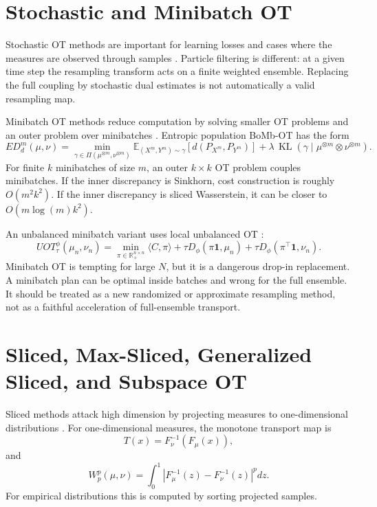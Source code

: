 \documentclass[11pt]{article}
\newcommand{\R}{\mathbb{R}}
\newcommand{\ones}{\mathbf{1}}
\newcommand{\KL}{\operatorname{KL}}
\begin{document}
\section{Stochastic and Minibatch OT}

Stochastic OT methods are important for learning losses and cases where the
measures are observed through samples
\citep{genevay2016stochastic,genevay2018samplecomplexity}.  Particle filtering
is different: at a given time step the resampling transform acts on a finite
weighted ensemble.
Replacing the full coupling by stochastic dual estimates is not automatically
a valid resampling map.

Minibatch OT methods reduce computation by solving smaller OT problems and an
outer problem over minibatches \citep{nguyen2022bomb}.  Entropic population
BoMb-OT has the form
\begin{equation}
ED^m_d(\mu,\nu)
=
\min_{\gamma\in\Pi(\mu^{\otimes m},\nu^{\otimes m})}
\mathbb{E}_{(X^m,Y^m)\sim\gamma}
\left[
  d(P_{X^m},P_{Y^m})
\right]
+\lambda\,\KL(\gamma\mid \mu^{\otimes m}\otimes\nu^{\otimes m}).
\label{eq:bomb-ot}
\end{equation}
For finite $k$ minibatches of size $m$, an outer $k\times k$ OT problem
couples minibatches.  If the inner discrepancy is Sinkhorn, cost construction
is roughly $O(m^2k^2)$.  If the inner discrepancy is sliced Wasserstein, it
can be closer to $O(m\log(m)k^2)$.

An unbalanced minibatch variant uses local unbalanced OT
\citep{nguyen2021partialminibatch}:
\begin{equation}
UOT^\phi_\tau(\mu_n,\nu_n)
=
\min_{\pi\in\R_+^{n\times n}}
\langle C,\pi\rangle
+\tau D_\phi(\pi\ones,\mu_n)
+\tau D_\phi(\pi^\top\ones,\nu_n).
\label{eq:uot}
\end{equation}
Minibatch OT is tempting for large $N$, but it is a dangerous drop-in
replacement.  A minibatch plan can be optimal inside batches and wrong for the
full ensemble.  It should be treated as a new randomized or approximate
resampling method, not as a faithful acceleration of full-ensemble transport.

\section{Sliced, Max-Sliced, Generalized Sliced, and Subspace OT}

Sliced methods attack high dimension by projecting measures to one-dimensional
distributions
\citep{kolouri2019generalized,deshpande2019maxsliced,paty2019subspace,nguyen2025sliced}.
For one-dimensional measures, the monotone transport map is
\begin{equation}
T(x)=F_\nu^{-1}(F_\mu(x)),
\label{eq:monotone-map}
\end{equation}
and
\begin{equation}
W_p^p(\mu,\nu)
=
\int_0^1
\left|
F_\mu^{-1}(z)-F_\nu^{-1}(z)
\right|^p dz.
\label{eq:oned-wasserstein}
\end{equation}
For empirical distributions this is computed by sorting projected samples.
\end{document}

